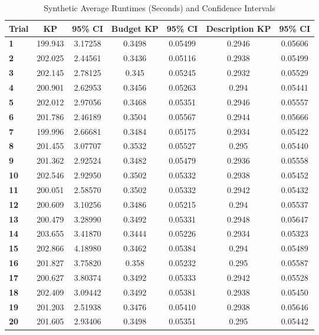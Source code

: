 \begin{table}[p]
 \begin{center}
  \caption{Synthetic Average Runtimes (Seconds) and Confidence Intervals}
  \label{tab:synthetictiming}
  \begin{tabular}{l|c|c|c|c|c|c}
  \textbf{Trial} & \textbf{KP} & \textbf{95\% CI} & \textbf{Budget KP} & \textbf{95\% CI} & \textbf{Description KP} & \textbf{95\% CI}\\
  \hline
  \textbf{1} & 199.943 & 3.17258 & 0.3498 & 0.05499 & 0.2946 & 0.05606\\
  \textbf{2} & 202.025 & 2.44561 & 0.3436 & 0.05116 & 0.2938 & 0.05499\\
  \textbf{3} & 202.145 & 2.78125 & 0.345 & 0.05245 & 0.2932 & 0.05529\\
  \textbf{4} & 200.901 & 2.62953 & 0.3456 & 0.05263 & 0.294 & 0.05441\\
  \textbf{5} & 202.012 & 2.97056 & 0.3468 & 0.05351 & 0.2946 & 0.05557\\
  \textbf{6} & 201.786 & 2.46189 & 0.3504 & 0.05567 & 0.2944 & 0.05666\\
  \textbf{7} & 199.996 & 2.66681 & 0.3484 & 0.05175 & 0.2934 & 0.05422\\
  \textbf{8} & 201.455 & 3.07707 & 0.3532 & 0.05527 & 0.295 & 0.05440\\
  \textbf{9} & 201.362 & 2.92524 & 0.3482 & 0.05479 & 0.2936 & 0.05558\\
  \textbf{10} & 202.546 & 2.92950 & 0.3502 & 0.05332 & 0.2938 & 0.05452\\
  \textbf{11} & 200.051 & 2.58570 & 0.3502 & 0.05332 & 0.2942 & 0.05432\\
  \textbf{12} & 200.609 & 3.10256 & 0.3486 & 0.05215 & 0.294 & 0.05537\\
  \textbf{13} & 200.479 & 3.28990 & 0.3492 & 0.05331 & 0.2948 & 0.05647\\
  \textbf{14} & 203.655 & 3.41870 & 0.3444 & 0.05226 & 0.2934 & 0.05323\\
  \textbf{15} & 202.866 & 4.18980 & 0.3462 & 0.05384 & 0.294 & 0.05489\\
  \textbf{16} & 201.827 & 3.75820 & 0.358 & 0.05232 & 0.295 & 0.05587\\
  \textbf{17} & 200.627 & 3.80374 & 0.3492 & 0.05333 & 0.2942 & 0.05528\\
  \textbf{18} & 202.409 & 3.09442 & 0.3492 & 0.05381 & 0.2938 & 0.05450\\
  \textbf{19} & 201.203 & 2.51938 & 0.3476 & 0.05410 & 0.2938 & 0.05646\\
  \textbf{20} & 201.605 & 2.93406 & 0.3498 & 0.05351 & 0.295 & 0.05442\\
  \end{tabular}
 \end{center}
\end{table}

